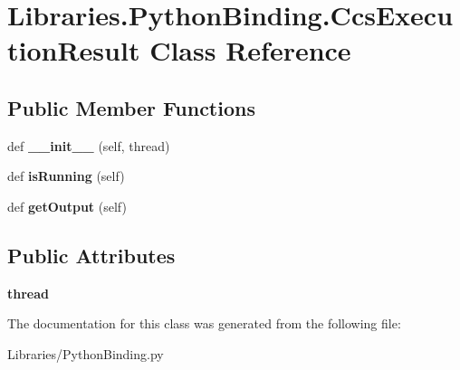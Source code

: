 \hypertarget{class_libraries_1_1_python_binding_1_1_ccs_execution_result}{}\section{Libraries.\+Python\+Binding.\+Ccs\+Execution\+Result Class Reference}
\label{class_libraries_1_1_python_binding_1_1_ccs_execution_result}
\subsection*{Public Member Functions}
\begin{DoxyCompactItemize}
\item 
def {\bfseries \+\_\+\+\_\+init\+\_\+\+\_\+} (self, thread)\hypertarget{class_libraries_1_1_python_binding_1_1_ccs_execution_result_a27cb8481803fb2ef2753ca9643dd8f51}{}\label{class_libraries_1_1_python_binding_1_1_ccs_execution_result_a27cb8481803fb2ef2753ca9643dd8f51}

\item 
def {\bfseries is\+Running} (self)\hypertarget{class_libraries_1_1_python_binding_1_1_ccs_execution_result_a95a18a004946e50855fdf4816c80a1c8}{}\label{class_libraries_1_1_python_binding_1_1_ccs_execution_result_a95a18a004946e50855fdf4816c80a1c8}

\item 
def {\bfseries get\+Output} (self)\hypertarget{class_libraries_1_1_python_binding_1_1_ccs_execution_result_ad6c260a74bd65e04ed1af2a02c21b95d}{}\label{class_libraries_1_1_python_binding_1_1_ccs_execution_result_ad6c260a74bd65e04ed1af2a02c21b95d}

\end{DoxyCompactItemize}
\subsection*{Public Attributes}
\begin{DoxyCompactItemize}
\item 
{\bfseries thread}\hypertarget{class_libraries_1_1_python_binding_1_1_ccs_execution_result_a6af53dbf8c608716df4028130d982099}{}\label{class_libraries_1_1_python_binding_1_1_ccs_execution_result_a6af53dbf8c608716df4028130d982099}

\end{DoxyCompactItemize}


The documentation for this class was generated from the following file\+:\begin{DoxyCompactItemize}
\item 
Libraries/Python\+Binding.\+py\end{DoxyCompactItemize}
